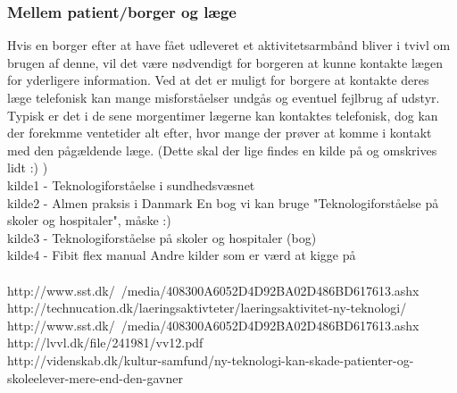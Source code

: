 \subsubsection{Mellem patient/borger og læge}
Hvis en borger efter at have fået udleveret et aktivitetsarmbånd bliver i tvivl om brugen af denne, vil det være nødvendigt for borgeren at kunne kontakte lægen for yderligere information. Ved at det er muligt for borgere at kontakte deres læge telefonisk kan mange misforståelser undgås og eventuel fejlbrug af udstyr. Typisk er det i de sene morgentimer lægerne kan kontaktes telefonisk, dog kan der forekmme ventetider alt efter, hvor mange der prøver at komme i kontakt med den pågældende læge.  (Dette skal der lige findes en kilde på og omskrives lidt :) ) \\

kilde1 - Teknologiforståelse i sundhedsvæsnet \\
kilde2 - Almen praksis i Danmark
En bog vi kan bruge "Teknologiforståelse på skoler og hospitaler", måske :) \\
kilde3 - Teknologiforståelse på skoler og hospitaler (bog)\\
kilde4 - Fibit flex manual
Andre kilder som er værd at kigge på \\\\

http://www.sst.dk/~/media/408300A6052D4D92BA02D486BD617613.ashx \\
http://technucation.dk/laeringsaktivteter/laeringsaktivitet-ny-teknologi/ \\
http://www.sst.dk/~/media/408300A6052D4D92BA02D486BD617613.ashx \\
http://lvvl.dk/file/241981/vv12.pdf \\

http://videnskab.dk/kultur-samfund/ny-teknologi-kan-skade-patienter-og-skoleelever-mere-end-den-gavner
